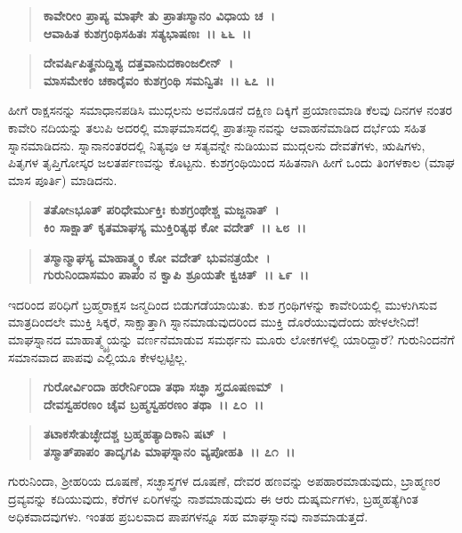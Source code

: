\begin{verse}
\textbf{ಕಾವೇರೀಂ ಪ್ರಾಪ್ಯ ಮಾಘೇ ತು ಪ್ರಾತಃಸ್ಮಾನಂ ವಿಧಾಯ ಚ~।}\\\textbf{ಆವಾಹಿತ ಕುಶಗ್ರಂಥಿಸಹಿತಃ ಸತ್ಯಭಾಷಣಃ~।। ೬೬~।। }
\end{verse}

\begin{verse}
\textbf{ದೇವರ್ಷಿಪಿತೄನುದ್ದಿಶ್ಯ ದತ್ತವಾನುದಕಾಂಜಲೀನ್~।}\\\textbf{ಮಾಸಮೇಕಂ ಚಕಾರೈವಂ ಕುಶಗ್ರಂಥಿ ಸಮನ್ವಿತಃ~।। ೬೭~।।}
\end{verse}

ಹೀಗೆ ರಾಕ್ಷಸನನ್ನು ಸಮಾಧಾನಪಡಿಸಿ ಮುದ್ಗಲನು ಅವನೊಡನೆ ದಕ್ಷಿಣ ದಿಕ್ಕಿಗೆ ಪ್ರಯಾಣಮಾಡಿ ಕೆಲವು ದಿನಗಳ ನಂತರ ಕಾವೇರಿ ನದಿಯನ್ನು ತಲುಪಿ ಅದರಲ್ಲಿ ಮಾಘಮಾಸದಲ್ಲಿ ಪ್ರಾತಃಸ್ನಾನವನ್ನು ಆವಾಹನೆಮಾಡಿದ ದರ್ಭೆಯ ಸಹಿತ ಸ್ನಾನಮಾಡಿದನು. ಸ್ನಾನಾನಂತರದಲ್ಲಿ ನಿತ್ಯವೂ ಆ ಸತ್ಯವನ್ನೇ ನುಡಿಯುವ ಮುದ್ಗಲನು ದೇವತೆಗಳು, ಋಷಿಗಳು, ಪಿತೃಗಳ ತೃಪ್ತಿಗೋಸ್ಕರ ಜಲತರ್ಪಣವನ್ನು ಕೊಟ್ಟನು. ಕುಶಗ್ರಂಥಿಯಿಂದ ಸಹಿತನಾಗಿ ಹೀಗೆ ಒಂದು ತಿಂಗಳಕಾಲ (ಮಾಘ ಮಾಸ ಪೂರ್ತಿ) ಮಾಡಿದನು.

\begin{verse}
\textbf{ತತೋsಭೂತ್ ಪರಿಧೇರ್ಮುಕ್ತಿಃ ಕುಶಗ್ರಂಥೇಶ್ಚ ಮಜ್ಜನಾತ್~।}\\\textbf{ಕಿಂ ಸಾಕ್ಷಾತ್ ಕೃತಮಾಘಸ್ಯ ಮುಕ್ತಿರಿತ್ಯಥ ಕೋ ವದೇತ್~।। ೬೮~।।} 
\end{verse}

\begin{verse}
\textbf{ತಸ್ಮಾನ್ಮಾಘಸ್ಯ ಮಾಹಾತ್ಮ್ಯಂ ಕೋ ವದೇತ್ ಭುವನತ್ರಯೇ~।}\\\textbf{ಗುರುನಿಂದಾಸಮಂ ಪಾಪಂ ನ ಕ್ವಾಪಿ ಶ್ರೂಯತೇ ಕ್ವಚಿತ್~।। ೬೯~।।}
\end{verse}

ಇದರಿಂದ ಪರಿಧಿಗೆ ಬ್ರಹ್ಮರಾಕ್ಷಸ ಜನ್ಮದಿಂದ ಬಿಡುಗಡೆಯಾಯಿತು. ಕುಶ ಗ್ರಂಥಿಗಳನ್ನು ಕಾವೇರಿಯಲ್ಲಿ ಮುಳುಗಿಸುವ ಮಾತ್ರದಿಂದಲೇ ಮುಕ್ತಿ ಸಿಕ್ಕರೆ, ಸಾಕ್ಷಾತ್ತಾಗಿ ಸ್ನಾನಮಾಡುವುದರಿಂದ ಮುಕ್ತಿ ದೊರೆಯುವುದೆಂದು ಹೇಳಲೇನಿದೆ! ಮಾಘಸ್ನಾನದ ಮಾಹಾತ್ಮ್ಯೈಯನ್ನು ವರ್ಣನೆ\-ಮಾಡುವ ಸಮರ್ಥನು ಮೂರು ಲೋಕಗಳಲ್ಲಿ ಯಾರಿದ್ದಾರೆ? ಗುರುನಿಂದನೆಗೆ ಸಮಾನವಾದ ಪಾಪವು ಎಲ್ಲಿಯೂ ಕೇಳಲ್ಪಟ್ಟಿಲ್ಲ.

\begin{verse}
\textbf{ಗುರೋರ್ವಿಂದಾ ಹರೇರ್ನಿಂದಾ ತಥಾ ಸಚ್ಛಾ ಸ್ತ್ರದೂಷಣಮ್~।}\\\textbf{ದೇವಸ್ವಹರಣಂ ಚೈವ ಬ್ರಹ್ಮಸ್ವಹರಣಂ ತಥಾ~।। ೭೦~।।} 
\end{verse}

\begin{verse}
\textbf{ತಟಾಕಸೇತುಚ್ಛೇದಶ್ಚ ಬ್ರಹ್ಮಹತ್ಯಾದಿಕಾನಿ ಷಟ್~।}\\\textbf{ತಸ್ಮಾತ್‌ಪಾಪಂ ತಾದೃಗಪಿ ಮಾಘಸ್ನಾನಂ ವ್ಯಪೋಹತಿ~।। ೭೧~।।}
\end{verse}

ಗುರುನಿಂದಾ, ಶ‍್ರೀಹರಿಯ ದೂಷಣೆ, ಸಚ್ಛಾಸ್ತ್ರಗಳ ದೂಷಣೆ, ದೇವರ ಹಣವನ್ನು ಅಪಹಾರಮಾಡುವುದು, ಬ್ರಾಹ್ಮಣರ ದ್ರವ್ಯವನ್ನು ಕದಿಯುವುದು, ಕೆರೆಗಳ ಏರಿಗಳನ್ನು ನಾಶಮಾಡುವುದು ಈ ಆರು ದುಷ್ಕರ್ಮಗಳು, ಬ್ರಹ್ಮಹತ್ಯೆಗಿಂತ ಅಧಿಕವಾದವುಗಳು. ಇಂತಹ ಪ್ರಬಲವಾದ ಪಾಪಗಳನ್ನೂ ಸಹ ಮಾಘಸ್ನಾನವು ನಾಶಮಾಡುತ್ತದೆ.

